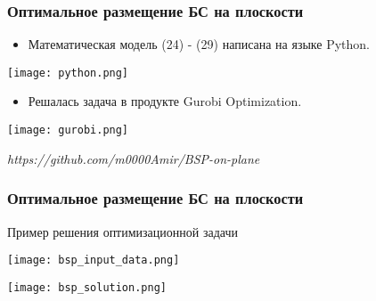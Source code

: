 \begin{frame}
    \frametitle{Оптимальное размещение БС на плоскости}
    \fontsize{10pt}{7.2}\selectfont
    \begin{itemize}
        \item Математическая модель (24) - (29) написана на языке Python.
    \end{itemize}


    \begin{minipage}[c]{0.45\linewidth}
        \fontsize{8pt}{7.2}\selectfont
        \bigskip
        \texttt{[image: python.png]}

    \end{minipage}

    \begin{itemize}
        \item Решалась задача в продукте Gurobi Optimization.
    \end{itemize}

    \bigskip

    \begin{minipage}[c]{0.45\linewidth}
        \fontsize{8pt}{7.2}\selectfont
        \bigskip
        \texttt{[image: gurobi.png]}

    \end{minipage}

    \bigskip
    \bigskip
    \bigskip


    \textit{https://github.com/m0000Amir/BSP-on-plane}

    
    
\end{frame}

\begin{frame}
    \frametitle{Оптимальное размещение БС на плоскости}
    \fontsize{8pt}{7.2}\selectfont
    \justifying
    Пример решения оптимизационной задачи

    \begin{minipage}[c]{0.45\linewidth}
        \fontsize{8pt}{7.2}\selectfont
        \bigskip
        \texttt{[image: bsp\_input\_data.png]}
        
    \end{minipage}
    \begin{minipage}[c]{0.45\linewidth}
        \texttt{[image: bsp\_solution.png]}

    \end{minipage}
    
    
\end{frame}

